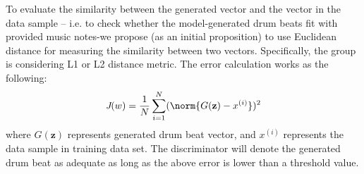 \begin{par}
      \par To evaluate the similarity between the generated vector and 
      the vector in the data sample -- i.e. to check whether the model-generated drum beats 
      fit with provided music notes-we propose (as an initial proposition) to use Euclidean distance for 
      measuring the similarity between two vectors. Specifically, the group is considering L1 or L2 
      distance metric. The error calculation works as the following: 
      \begin{equation}
          \emph{J}(w) = \frac{1}{N} \sum_{i=1}^{N} (\norm{G(\mathbf{z})-x^{(i)}})^2
      \end{equation}
      where $G(\mathbf{z})$ represents generated drum beat vector, and $x^{(i)}$
      represents the data sample in training data set. The discriminator will denote the generated drum 
      beat as adequate as long as the above error is lower than a threshold value.
  
  \end{par}